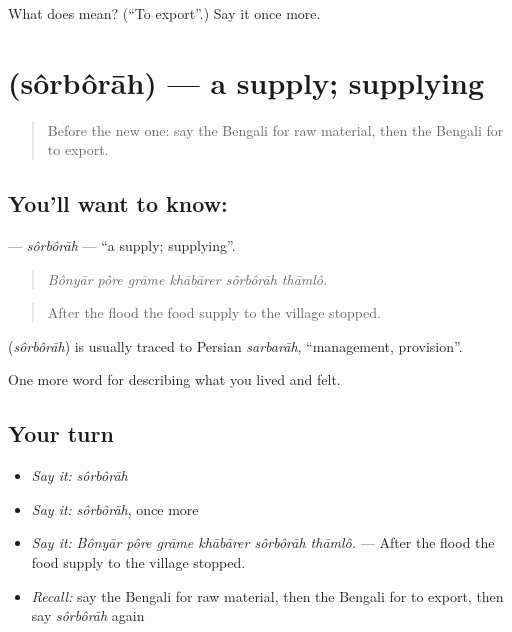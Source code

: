 \begin{tcolorbox}[breakable,colback=teal!4,colframe=teal!35!black,title={Before you move on}]
What does   mean? (\textquotedblleft{}To export\textquotedblright{}.) Say it once more.
\end{tcolorbox}
\section[\texorpdfstring{\bn{সরবরাহ} (sôrbôrāh)}{সরবরাহ (sôrbôrāh)}]{ (sôrbôrāh) — a supply; supplying}

\label{lesson:BN-C499-sorborah}



\begin{quote}
Before the new one: say the Bengali for raw material, then the Bengali for to export.
\end{quote}

\subsection*{You'll want to know: }
\textbf{} — \emph{sôrbôrāh} — \textquotedblleft{}a supply; supplying\textquotedblright{}.

\begin{quote}
     
\end{quote}

\begin{quote}
\emph{Bônyār pôre grāme khābārer sôrbôrāh thāmlô.}
\end{quote}

\begin{quote}
After the flood the food supply to the village stopped.
\end{quote}

\begin{cousinweb}
\textbf{} (\emph{sôrbôrāh}) is usually traced to Persian \emph{sarbarāh}, \textquotedblleft{}management, provision\textquotedblright{}.
\end{cousinweb}

\begin{grammarlens}[title={What you've built}]
One more word for describing what you lived and felt.
\end{grammarlens}

\subsection*{Your turn}
\begin{itemize}
\raggedright
  \item \emph{Say it:} \emph{sôrbôrāh}
  \item \emph{Say it:} \emph{sôrbôrāh}, once more
  \item \emph{Say it:} \emph{Bônyār pôre grāme khābārer sôrbôrāh thāmlô.} — After the flood the food supply to the village stopped.
  \item \emph{Recall:} say the Bengali for raw material, then the Bengali for to export, then say \emph{sôrbôrāh} again
\end{itemize}

